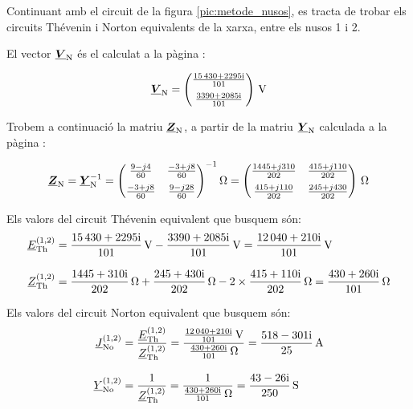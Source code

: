 \begin{exemple}\label{ex:XarxaThevenin}
	\addcontentsxms{\XarxaThevenin}
    Continuant amb el circuit de la figura \vref{pic:metode_nusos}, es
    tracta de trobar els circuits Thévenin i Norton equivalents de la
    xarxa, entre els nusos 1 i 2.

    El vector $\underline{\boldsymbol{V}}_\mathrm{N}$ és el calculat a la pàgina \pageref{eq:vn_exemp}:

    \[
      \mcmplx{V}\ped{N} =
      \begin{pmatrix}
            \frac{\complexnum{15430 + j 2295}}{101} \\[2mm]
            \frac{\complexnum{3390 + j 2085}}{101}
      \end{pmatrix}\,\unit{V}
   \]

    Trobem a continuació la matriu $\underline{\boldsymbol{Z}}_\mathrm{N}$, a partir de la matriu $\underline{\boldsymbol{Y}}_\mathrm{N}$
    calculada a la pàgina \pageref{eq:yn}:

    \[
       \mcmplx{Z}\ped{N} =  \mcmplx{Y}\ped{N}^{-1} =
       \begin{pmatrix}
                \frac{9 - j 4}{60} & \frac{-3 + j 8}{60} \\[2mm]
                \frac{-3 + j 8}{60} & \frac{9 - j 28}{60}
          \end{pmatrix} ^{-1}\unit{\ohm} =
       \begin{pmatrix}
             \frac{1445 + j 310}{202} & \frac{415 + j 110}{202} \\[2mm]
             \frac{415 + j 110}{202} & \frac{245 + j 430}{202}
       \end{pmatrix}\,\unit{\ohm}
    \]

    Els valors del circuit Thévenin equivalent que busquem són:
    \begin{align*}
       \cmplx{E}\ped{Th}^{(1,2)} &= \frac{\complexnum{15430+j2295}}{101}\,\unit{V} - \frac{\complexnum{3390+j2085}}{101}\,\unit{V} =
       \frac{\complexnum{12040+j210}}{101}\,\unit{V} \\[2ex]
       \cmplx{Z}\ped{Th}^{(1,2)} &= \frac{\complexnum{1445+j310}}{202}\,\unit{\ohm} + \frac{\complexnum{245+j430}}{202}\,\unit{\ohm} -
       2\times\frac{\complexnum{415+j110}}{202}\,\unit{\ohm} = \frac{\complexnum{430+j260}}{101}\,\unit{\ohm}
    \end{align*}

    Els valors del circuit Norton equivalent que busquem són:
    \begin{align*}
       \cmplx{J}\ped{No}^{(1,2)} &= \frac{\cmplx{E}\ped{Th}^{(1,2)}}{\cmplx{Z}\ped{Th}^{(1,2)}} =
       \frac{\frac{\complexnum{12040+j210}}{101}\,\unit{V}}{\frac{\complexnum{430+j260}}{101}\,\unit{\ohm}} =
       \frac{\complexnum{518-j301}}{25}\,\unit{A} \\[2ex]
       \cmplx{Y}\ped{No}^{(1,2)} &= \frac{1}{\cmplx{Z}\ped{Th}^{(1,2)}} =
       \frac{1}{\frac{\complexnum{430+j260}}{101}\,\unit{\ohm}} = \frac{\complexnum{43-j26}}{250}\,\unit{S}
    \end{align*}

\end{exemple}

